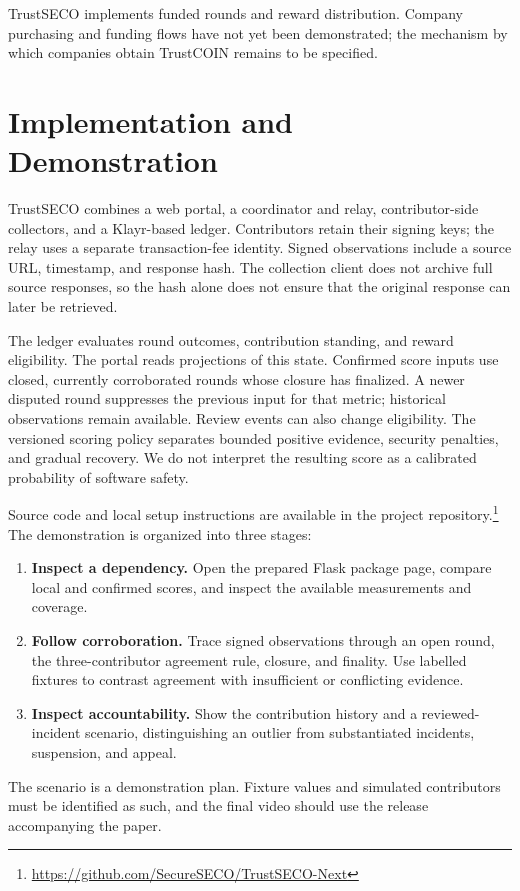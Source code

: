 \documentclass[10pt,conference]{IEEEtran}
\begin{document}
TrustSECO implements funded rounds and reward distribution. Company purchasing and funding flows have not yet been demonstrated; the mechanism by which companies obtain TrustCOIN remains to be specified.

\section{Implementation and Demonstration}
\label{sec:implementation}
TrustSECO combines a web portal, a coordinator and relay, contributor-side collectors, and a Klayr-based ledger. Contributors retain their signing keys; the relay uses a separate transaction-fee identity. Signed observations include a source URL, timestamp, and response hash. The collection client does not archive full source responses, so the hash alone does not ensure that the original response can later be retrieved.

The ledger evaluates round outcomes, contribution standing, and reward eligibility. The portal reads projections of this state. Confirmed score inputs use closed, currently corroborated rounds whose closure has finalized. A newer disputed round suppresses the previous input for that metric; historical observations remain available. Review events can also change eligibility. The versioned scoring policy separates bounded positive evidence, security penalties, and gradual recovery. We do not interpret the resulting score as a calibrated probability of software safety.

Source code and local setup instructions are available in the project repository.\footnote{\url{https://github.com/SecureSECO/TrustSECO-Next}} The demonstration is organized into three stages:
\begin{enumerate}
\item \textbf{Inspect a dependency.} Open the prepared Flask package page, compare local and confirmed scores, and inspect the available measurements and coverage.
\item \textbf{Follow corroboration.} Trace signed observations through an open round, the three-contributor agreement rule, closure, and finality. Use labelled fixtures to contrast agreement with insufficient or conflicting evidence.
\item \textbf{Inspect accountability.} Show the contribution history and a reviewed-incident scenario, distinguishing an outlier from substantiated incidents, suspension, and appeal.
\end{enumerate}
The scenario is a demonstration plan. Fixture values and simulated contributors must be identified as such, and the final video should use the release accompanying the paper.
\end{document}
